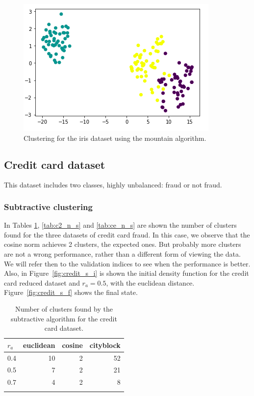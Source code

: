 \documentclass[conference]{IEEEtran}
\begin{document}
\begin{figure}[ht]
    \centering
    \includegraphics[scale = 0.45]{figures/iris/mountain.png}
    \caption{Clustering for the iris dataset using the mountain algorithm.}
    \label{fig:mon-iris}
\end{figure}


\subsection{Credit card dataset}
This dataset includes two classes, highly unbalanced: fraud or not fraud.
\subsubsection{Subtractive clustering}
    In Tables \ref{tab:c1_n_s}, \ref{tab:c2_n_s} and \ref{tab:ce_n_s} are shown the number of clusters found for the three datasets of credit card fraud. In this case, we observe that the cosine norm achieves 2 clusters, the expected ones. But probably more clusters are not a wrong performance, rather than a different form of viewing the data. We will refer then to the validation indices to see when the performance is better. Also, in Figure~\ref{fig:credit_s_i} is shown the initial density function for the credit card reduced dataset and $r_a = 0.5$, with the euclidean distance. Figure~\ref{fig:credit_s_f} shows the final state.
    \begin{table}[ht!]
        \centering
        \begin{tabular}{lrrr}
        \toprule
        $r_a$ &  euclidean &  cosine &  cityblock \\
        \midrule
        0.4 &         10 &       2 &         52 \\
        0.5 &          7 &       2 &         21 \\
        0.7 &          4 &       2 &          8 \\
        \bottomrule \\
        \end{tabular}
        \caption{Number of clusters found by the subtractive algorithm for the credit card dataset.}
        \label{tab:c1_n_s}
    \end{table}
    
\end{document}
